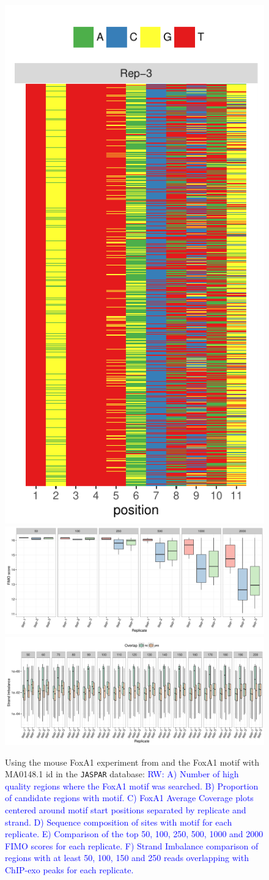 \documentclass{bmcart}
\newcommand{\RW}[1]{\textcolor{blue}{RW: #1}}
\begin{document}
\begin{figure}[h!]
  \includegraphics[width = .25\textwidth,page = 1]{figures/fig4/FoxA1_matched_motif_sequence.pdf}  
  \includegraphics[width = .8\textwidth,page = 1]{figures/fig4/FoxA1_fimo_score.pdf}
  \includegraphics[width = .8\textwidth,page = 2]{figures/fig4/strand_imbalance_FoxA1.pdf}
  \caption{Using the mouse FoxA1 experiment from \cite{exoillumina}
    and the FoxA1 motif with MA0148.1 id in the \texttt{JASPAR}
    database: \RW{ A) Number of high quality regions where the FoxA1
      motif was searched. B) Proportion of candidate regions with
      motif. C) FoxA1 Average Coverage plots centered around motif
      start positions separated by replicate and strand. D) Sequence
      composition of sites with motif for each replicate. E)
      Comparison of the top 50, 100, 250, 500, 1000 and 2000 FIMO
      scores for each replicate. F) Strand Imbalance comparison of
      regions with at least 50, 100, 150 and 250 reads overlapping
      with ChIP-exo peaks for each replicate.}}
  \label{fig:4}
\end{figure}
\end{document}
